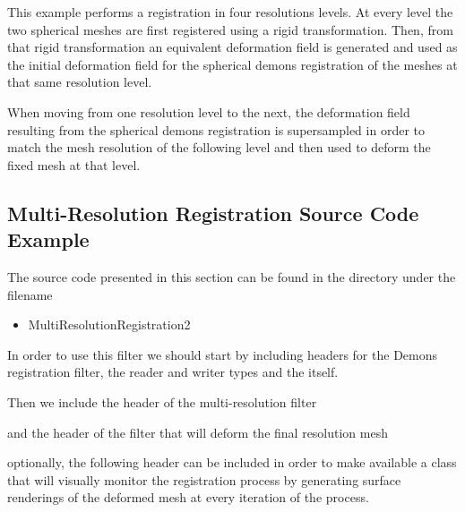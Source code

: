 \documentclass{InsightArticle}
\begin{document}
This example performs a registration in four resolutions levels. At every level
the two spherical meshes are first registered using a rigid transformation.
Then, from that rigid transformation an equivalent deformation field is
generated and used as the initial deformation field for the spherical demons
registration of the meshes at that same resolution level.

When moving from one resolution level to the next, the deformation field
resulting from the spherical demons registration is supersampled in order to
match the mesh resolution of the following level and then used to deform
the fixed mesh at that level.

\subsection{Multi-Resolution Registration Source Code Example}

The source code presented in this section can be found in the 
directory under the filename

\begin{itemize}
\item MultiResolutionRegistration2
\end{itemize}

In order to use this filter we should start by including headers for the Demons
registration filter, the reader and writer types and the 
itself.

\begin{center}

\end{center}

Then we include the header of the multi-resolution filter

\begin{center}

\end{center}

and the header of the filter that will deform the final resolution mesh

\begin{center}

\end{center}

optionally, the following header can be included in order to make available a
class that will visually monitor the registration process by generating surface
renderings of the deformed mesh at every iteration of the process.
\end{document}
